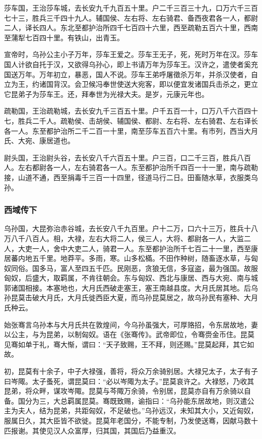 \documentclass[]{article}
\begin{document}
莎车国，王治莎车城，去长安九千九百五十里。户二千三百三十九，口万六千三百七十三，胜兵三千四十九人。辅国侯、左右将、左右骑君、备西夜君各一人，都尉二人，译长四人。东北至都护治所四千七百四十六里，西至疏勒五百六十里，西南至蒲犁七百四十里。有铁山，出青玉。

宣帝时，乌孙公主小子万年，莎车王爱之。莎车王无子，死，死时万年在汉。莎车国人计欲自托于汉，又欲得乌孙心，即上书请万年为莎车王。汉许之，遣使者奚充国送万年。万年初立，暴恶，国人不说。莎车王弟呼屠徵杀万年，并杀汉使者，自立为王，约诸国背汉。会卫候冯奉世使送大宛客，即以便宜发诸国兵击杀之，更立它昆弟子为莎车王。还，拜奉世为光禄大夫。是岁，元康元年也。

疏勒国，王治疏勒城，去长安九千三百五十里。户千五百一十，口万八千六百四十七，胜兵二千人。疏勒侯、击胡侯、辅国侯、都尉、左右将、左右骑君、左右译长各一人。东至都护治所二千二百一十里，南至莎车五百六十里。有市列，西当大月氏、大宛、康居道也。

尉头国，王治尉头谷，去长安八千六百五十里。户三百，口二千三百，胜兵八百人。左右都尉各一人，左右骑君各一人。东至都护治所千四百一十一里，南与疏勒接，山道不通，西至捐毒千三百一十四里，径道马行二日。田畜随水草，衣服类乌孙。

\hypertarget{header-n6422}{%
\subsubsection{西域传下}\label{header-n6422}}

乌孙国，大昆弥治赤谷城，去长安八千九百里。户十二万，口六十三万，胜兵十八万八千八百人。相，大禄，左右大将二人，侯三人，大将、都尉各一人，大监二人，大吏一人，舍中大吏二人，骑君一人。东至都护治所千七百二十一里，西至康居蕃内地五千里。地莽平。多雨，寒。山多松樠。不田作种树，随畜逐水草，与匈奴同俗。国多马，富人至四五千匹。民刚恶，贪狼无信，多寇盗，最为强国。故服匈奴，后盛大，取羁属，不肯往朝会。东与匈奴、西北与康居、西与大宛、南与城郭诸国相接。本塞地也，大月氏西破走塞王，塞王南越县度。大月氏居其地。后乌孙昆莫击破大月氏，大月氏徙西臣大夏，而乌孙昆莫居之，故乌孙民有塞种、大月氏种云。

始张骞言乌孙本与大月氏共在敦煌间，今乌孙虽强大，可厚赂招，令东居故地，妻以公主，与为昆弟，以制匈奴。语在《张骞传》。武帝即位，令骞赍金币住。昆莫见骞如单于礼，骞大惭，谓曰：``天子致赐，王不拜，则还赐。''昆莫起拜，其它如故。

初，昆莫有十余子，中子大禄强，善将，将众万余骑别居。大禄兄太子，太子有子曰岑陬。太子蚤死，谓昆莫曰：``必以岑陬为太子。''昆莫哀许之。大禄怒，乃收其昆弟，将众畔，谋攻岑陬。昆莫与芩陬万余骑，令别居，昆莫亦自有万余骑以自备。国分为三，大总羁属昆莫。骞既致赐，谕指曰：``乌孙能东居故地，则汉遣公主为夫人，结为昆弟，共距匈奴，不足破也。''乌孙远汉，未知其大小，又近匈奴，服属日久，其大臣皆不欲徙。昆莫年老国分，不能专制，乃发使送骞，因献马数十匹报谢。其使见汉人众富厚，归其国，其国后乃益重汉。
\end{document}
